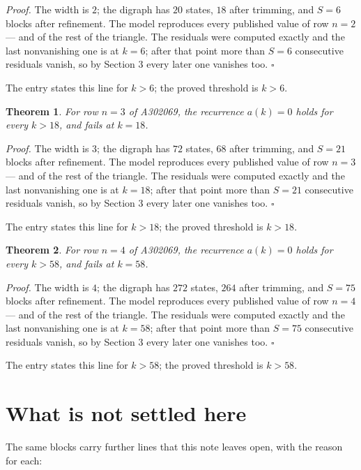\documentclass[11pt]{article}
\newtheorem{theorem}{Theorem}
\theoremstyle{definition}
\begin{document}
{\itshape Proof.} The width is $2$; the digraph has $20$ states, $18$ after trimming, and $S = 6$ blocks after refinement. The model reproduces every published value of row $n = 2$ --- and of the rest of the triangle. The residuals were computed exactly and the last nonvanishing one is at $k = 6$; after that point more than $S = 6$ consecutive residuals vanish, so by Section 3 every later one vanishes too. $\square$

The entry states this line for $k > 6$; the proved threshold is $k > 6$.

\begin{theorem} For row $n = 3$ of A302069, the recurrence $a(k) = 0$ holds for every $k > 18$, and fails at $k = 18$.\end{theorem}

{\itshape Proof.} The width is $3$; the digraph has $72$ states, $68$ after trimming, and $S = 21$ blocks after refinement. The model reproduces every published value of row $n = 3$ --- and of the rest of the triangle. The residuals were computed exactly and the last nonvanishing one is at $k = 18$; after that point more than $S = 21$ consecutive residuals vanish, so by Section 3 every later one vanishes too. $\square$

The entry states this line for $k > 18$; the proved threshold is $k > 18$.

\begin{theorem} For row $n = 4$ of A302069, the recurrence $a(k) = 0$ holds for every $k > 58$, and fails at $k = 58$.\end{theorem}

{\itshape Proof.} The width is $4$; the digraph has $272$ states, $264$ after trimming, and $S = 75$ blocks after refinement. The model reproduces every published value of row $n = 4$ --- and of the rest of the triangle. The residuals were computed exactly and the last nonvanishing one is at $k = 58$; after that point more than $S = 75$ consecutive residuals vanish, so by Section 3 every later one vanishes too. $\square$

The entry states this line for $k > 58$; the proved threshold is $k > 58$.

\section{What is not settled here}

The same blocks carry further lines that this note leaves open, with the reason for each:
\end{document}
